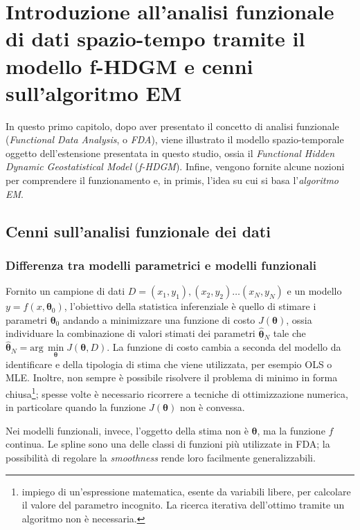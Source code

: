 \chapter[Il modello f-HDGM e l'algoritmo EM]{Introduzione all'analisi funzionale di dati spazio-tempo tramite il modello f-HDGM e cenni sull'algoritmo EM}

In questo primo capitolo, dopo aver presentato il concetto di analisi funzionale (\textit{Functional Data Analysis}, o \textit{FDA}), viene illustrato il modello spazio-temporale oggetto dell'estensione presentata in questo studio, ossia il \textit{Functional Hidden Dynamic Geostatistical Model} (\textit{f-HDGM}). Infine, vengono fornite alcune nozioni per comprendere il funzionamento e, in primis, l'idea su cui si basa l'\textit{algoritmo EM}.

\section[Cenni sull'analisi funzionale dei dati]{Cenni sull'analisi funzionale dei dati}

\subsection[Differenza tra modelli parametrici e modelli funzionali]{Differenza tra modelli parametrici e modelli funzionali}
Fornito un campione di dati $D = (x_1, y_1), (x_2, y_2)\dots (x_N, y_N)$ e un modello $y = f(x, \boldsymbol{\theta}_0)$, l'obiettivo della statistica inferenziale è quello di stimare i parametri $\boldsymbol{\theta}_0$ andando a minimizzare una funzione di costo $J(\boldsymbol{\theta})$, ossia individuare la combinazione di valori stimati dei parametri $\boldsymbol{\hat{\theta}}_N$ tale che $\boldsymbol{\hat{\theta}}_N = \text{arg}\,\min\limits_{\boldsymbol{\theta}} J(\boldsymbol{\theta}, D)$. La funzione di costo cambia a seconda del modello da identificare e della tipologia di stima che viene utilizzata, per esempio OLS o MLE. Inoltre, non sempre è possibile risolvere il problema di minimo in forma chiusa\footnote{impiego di un'espressione matematica, esente da variabili libere, per calcolare il valore del parametro incognito. La ricerca iterativa dell'ottimo tramite un algoritmo non è necessaria.}; spesse volte è necessario ricorrere a tecniche di ottimizzazione numerica, in particolare quando la funzione $J(\boldsymbol{\theta})$ non è convessa. \par Nei modelli funzionali, invece, l'oggetto della stima non è $\boldsymbol{\theta}$, ma la funzione $f$ continua. Le spline sono una delle classi di funzioni più utilizzate in FDA; la possibilità di regolare  la \textit{smoothness} rende loro facilmente generalizzabili.


